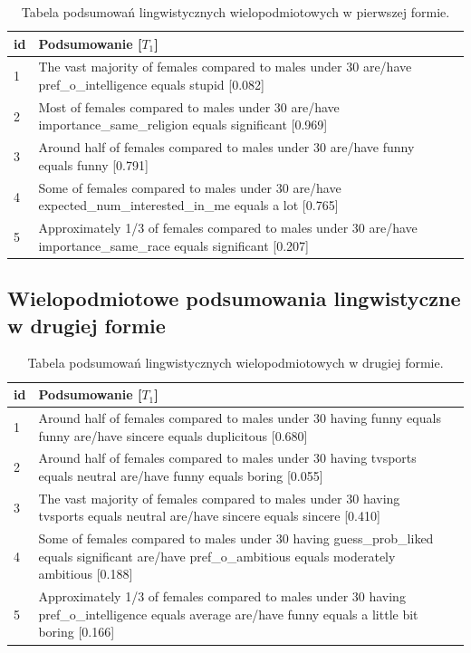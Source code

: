 \documentclass{classrep}
\begin{document}
\begin{center}
  \begin{table}[H]
    \begin{tabularx}{\textwidth}{lXc}
    
    id & Podsumowanie [$T_1$] \\ \hline 
  
    1 & The vast majority of females compared to males under 30 are/have pref\_o\_intelligence equals stupid [0.082] \\\hline
    2 & Most of females compared to males under 30 are/have importance\_same\_religion equals significant [0.969] \\  \hline
    3 & Around half of females compared to males under 30 are/have funny equals funny [0.791] \\ \hline
    4 & Some of females compared to males under 30 are/have expected\_num\_interested\_in\_me equals a lot [0.765]\\ \hline
    5 & Approximately 1/3 of females compared to males under 30 are/have importance\_same\_race equals significant [0.207] \\ \hline
  \end{tabularx}
  \caption{Tabela podsumowań lingwistycznych wielopodmiotowych w pierwszej formie.}
\end{table}
\end{center}

\subsection{Wielopodmiotowe podsumowania lingwistyczne w drugiej formie}

\begin{center}
  \begin{table}[H]
    \begin{tabularx}{\textwidth}{lXc}
    
    id & Podsumowanie [$T_1$]\\ \hline 
  
    1 & Around half of females compared to males under 30 having funny equals funny are/have sincere equals duplicitous [0.680] \\\hline
    2 & Around half of females compared to males under 30 having tvsports equals neutral are/have funny equals boring [0.055]\\  \hline
    3 & The vast majority of females compared to males under 30 having tvsports equals neutral are/have sincere equals sincere [0.410] \\ \hline
    4 & Some of females compared to males under 30 having guess\_prob\_liked equals significant are/have pref\_o\_ambitious equals moderately ambitious [0.188]\\ \hline
    5 & Approximately 1/3 of females compared to males under 30 having pref\_o\_intelligence equals average are/have funny equals a little bit boring [0.166]\\ \hline
  \end{tabularx}
  \caption{Tabela podsumowań lingwistycznych wielopodmiotowych w drugiej formie.}
\end{table}
\end{center}
\end{document}
